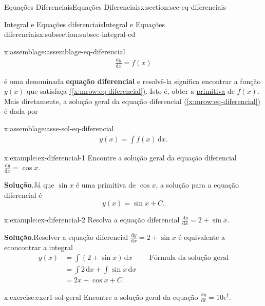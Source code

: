 \documentclass[oneside,10pt,]{article}
\newcommand{\blocktitlefont}{\relax}
\newcommand{\xreffont}{\relax}
\newcommand{\terminology}[1]{\textbf{#1}}
\numberwithin{equation}{section}
\newcommand{\dd}{\mathrm{d}}
\newcommand{\integral}[2]{\displaystyle\int {#1}\,\dd {#2}}
\newcommand{\amp}{&}
\begin{document}
\begin{sectionptx}{Equações Diferenciais}{}{Equações Diferenciais}{}{}{x:section:sec-eq-diferenciais}
\begin{subsectionptx}{Integral e Equações diferenciais}{}{Integral e Equações diferenciais}{}{}{x:subsection:subsec-integral-ed}
\begin{assemblage}{}{x:assemblage:assemblage-eq-diferencial}
%
\begin{gather}
\frac{\dd y}{\dd x} = f(x)\label{x:mrow:eq-diferencial}
\end{gather}
%
\end{assemblage}
 é uma denominada \terminology{equação diferencial} e resolvê-la significa encontrar a função \(y(x)\) que  satisfaça \hyperref[x:mrow:eq-diferencial]{({\xreffont\ref{x:mrow:eq-diferencial}})}. Isto é, obter a \hyperref[x:definition:def-primitiva]{primitiva} de \(f(x)\). Mais diretamente, a solução geral da equação diferencial \hyperref[x:mrow:eq-diferencial]{({\xreffont\ref{x:mrow:eq-diferencial}})} é dada por%
\begin{assemblage}{}{x:assemblage:asse-sol-eq-diferencial}%
%
\begin{gather}
y(x)=\integral{f(x)}{x}\text{.}\label{g:mrow:idp67}
\end{gather}
%
\end{assemblage}
\begin{example}{}{x:example:ex-diferencial-1}%
Encontre a solução geral da equação diferencial  \(\frac{\dd y}{\dd x} = \cos{x}\).%
\par\smallskip%
\noindent\textbf{\blocktitlefont Solução}.\hypertarget{g:solution:idp68}{}\quad{}Já que \(\sin{x}\) é uma primitiva de \(\cos{x}\), a solução para a equação diferencial é%
\begin{equation*}
y(x) = \sin{x} + C.
\end{equation*}
%
\end{example}
\begin{example}{}{x:example:ex-diferencial-2}%
Resolva a equação diferencial \(\frac{\dd y}{\dd x} = 2 + \sin{x}\).%
\par\smallskip%
\noindent\textbf{\blocktitlefont Solução}.\hypertarget{g:solution:idp69}{}\quad{}Resolver a equação diferencial \(\frac{\dd y}{\dd x} = 2 + \sin{x}\) é equivalente a econcontrar a integral%
\begin{align*}
y(x) \amp = \integral{\left(2+ \sin{x}\right)}{x} \amp \quad \hyperref[x:assemblage:asse-sol-eq-diferencial]{\text{Fórmula da solução geral}} \\
\amp =\integral{2}{x} + \integral{\sin{x}}{x}\\
\amp = 2x -\cos{x} + C\text{.}
\end{align*}
%
\end{example}
\begin{inlineexercise}{}{x:exercise:exer1-sol-geral}%
Encontre a solução geral da equação \(\frac{\dd y}{\dd t}=10e^t\).%
\par\smallskip%

\end{inlineexercise}
\end{subsectionptx}
\end{sectionptx}
\end{document}
